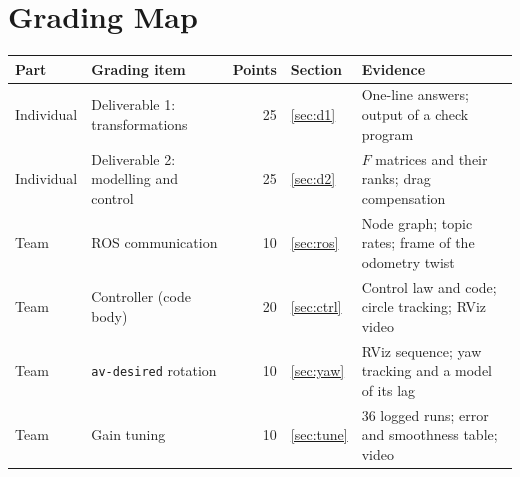 \documentclass[a4paper]{tufte-handout}
\author[\studentname]{\studentname\\[2pt]
  {\normalsize\normalfont Student ID \studentids\quad Group~7\\ \coursename}}
\begin{document}
\maketitle

\begin{abstract}
A geometric tracking controller on $\mathrm{SE}(3)$ was implemented
for the simulated quadrotor of the MIT VNAV Lab~3 and tuned to follow a circle of
radius \SI{5}{m} at \SI{2}{m} altitude.
With the final gains $(k_x,k_v,k_R,k_\Omega)=(8,5,10,2)$ the position error is
\SI{4.3}{cm} RMS and the pitch jitter \SI{0.26}{\degree}, and the drone's yaw
trails the rotating \texttt{av-desired} frame by \SI{5.86}{\degree}, close to the
\SI{5.74}{\degree} predicted from the control law.
Gains chosen on tracking error alone reached \SI{1.8}{cm} but made the rotors
chatter and reverse, and were rejected.
\end{abstract}

\section*{Grading Map}

\begin{table}[h]
\small
\begin{tabularx}{\linewidth}{@{}l l r l X@{}}
\toprule
Part & Grading item & Points & Section & Evidence \\
\midrule
Individual & Deliverable 1: transformations & 25 & \cref{sec:d1} & One-line answers; output of a check program \\
Individual & Deliverable 2: modelling and control & 25 & \cref{sec:d2} & $F$ matrices and their ranks; drag compensation \\
Team & ROS communication & 10 & \cref{sec:ros} & Node graph; topic rates; frame of the odometry twist \\
Team & Controller (code body) & 20 & \cref{sec:ctrl} & Control law and code; circle tracking; RViz video \\
Team & \texttt{av-desired} rotation & 10 & \cref{sec:yaw} & RViz sequence; yaw tracking and a model of its lag \\
Team & Gain tuning & 10 & \cref{sec:tune} & 36 logged runs; error and smoothness table; video \\
\bottomrule
\end{tabularx}
\end{table}
\end{document}
